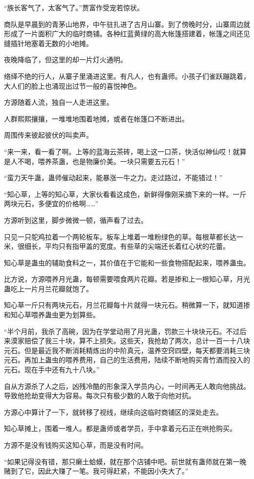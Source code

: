 \begin{this_body}
“族长客气了，太客气了。”贾富作受宠若惊状。

商队是早晨到的青茅山地界，中午驻扎进了古月山寨。到了傍晚时分，山寨周边就形成了一片面积广大的临时商铺。各种红蓝黄绿的高大帐篷搭建着，帐篷之间还见缝插针地塞着无数的小地摊。

夜晚降临了，但这里的却一片灯火通明。

络绎不绝的行人，从寨子里涌进这里。有凡人，也有蛊师。小孩子们雀跃蹦跳着，大人们的脸上也涌现出过节一般的喜悦神色。

方源随着人流，独自一人走进这里。

人群熙熙攘攘，一堆堆地围着地摊，或者在帐篷口不断进出。

周围传来彼起彼伏的叫卖声。

“来一来，看一看了啊。上等的蓝海云茶砖，喝上这一口茶，快活似神仙哎！就算是人不喝，喂养茶蛊，也是物廉价美。一块只需要五元石！”

“蛮力天牛蛊，蛊师催动起来，能暴涨一牛之力。走过路过，不能错过！”

“知心草，上等的知心草，大家伙看看这成色，新鲜得像刚采摘下来的一样。一斤两块元石，多便宜的价格啊……”

方源听到这里，脚步微微一顿，循声看了过去。

只见一只鸵鸡拉着一个两轮板车。板车上堆着一堆粉绿色的草。每根草都长达一米，很细长，平均只有指甲盖的宽度。有些草的尖端还长着红心状的花蕾。

知心草是蛊虫的辅助食料之一，其价值在于它能和一些食物搭配起来，喂养蛊虫。

比方说，方源喂养月光蛊，每顿需要喂食两片花瓣。若是掺和上一根知心草，月光蛊吃上一片月兰花瓣就饱了。

知心草一斤只有两块元石，月兰花瓣每十片就得一块元石。稍微算一下，就知道掺和知心草喂养蛊虫更为划算些。

“半个月前，我杀了高碗，因为在学堂动用了月光蛊，罚款三十块块元石。不过后来漠家赔偿了我三十块，算不上损失。这些天，我抢劫了两次，总计一百一十八块元石。但是最近我不断消耗精炼出的中阶真元，温养空窍四壁，每天都要消耗三块元石。再加上蛊虫的喂养费用，自己的生活费用，陆续不断地购买青竹酒而投入的元石。现在手中还有九十八块。”

自从方源杀了人之后，凶残冷酷的形象深入学员内心，一时间再无人敢向他挑战。导致他抢劫变得大为容易。每次只有极少数的人敢于向他对抗。

方源心中算计了一下，就转移了视线，继续向这临时商铺区的深处走去。

知心草摊上，围着一堆人。都是蛊师或者学员，手中拿着元石正在哄抢购买。

方源不是没有钱购买这知心草，而是没有时间。

“如果记得没有错，那只癞土蛤蟆，就在那个店铺中吧。前世就有蛊师就在第一晚赌到了它，因此大赚了一笔。我可得赶紧，不能因小失大了。”

\end{this_body}

